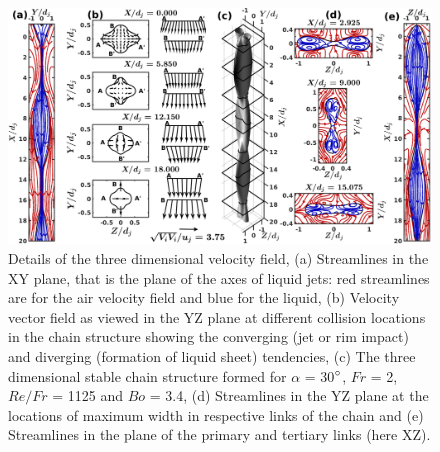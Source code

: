 \documentclass[%
aip,
sd,%
amsmath,amssymb,
preprint,%
author-year,%
]{revtex4-1}
\begin{document}
\begin{figure}
	\centering
	\includegraphics[width=\linewidth]{streamlinesDetails}
	\caption{Details of the three dimensional velocity field, (a) Streamlines in the XY plane, that is the plane of the axes of liquid jets: red streamlines are for the air velocity field and blue for the liquid, (b) Velocity vector field as viewed in the YZ plane at different collision locations in the chain structure showing the converging (jet or rim impact) and diverging (formation of liquid sheet) tendencies, (c) The three dimensional stable chain structure formed for $\alpha$ = 30$\degree$, $Fr$ = 2,  $Re/Fr$ = 1125 and $Bo$ = 3.4, (d) Streamlines in the YZ plane at the locations of maximum width in respective links of the chain and (e) Streamlines in the plane of the primary and tertiary links (here XZ).}
	\label{Figure::streamDetails}
\end{figure}
\end{document}
